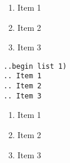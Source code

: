 \documentclass[12pt]{article}
\begin{document}
\begin{flushleft}
\begin{enumerate}[label=(\roman*)]
    \item Item 1
    \item Item 2
    \item Item 3
\end{enumerate}

\verb|..begin list 1)|\\
\verb|.. Item 1|\\
\verb|.. Item 2|\\
\verb|.. Item 3|\\

\begin{enumerate}[label=\arabic*)]
    \item Item 1
    \item Item 2
    \item Item 3
\end{enumerate}
\end{flushleft}
\end{document}
